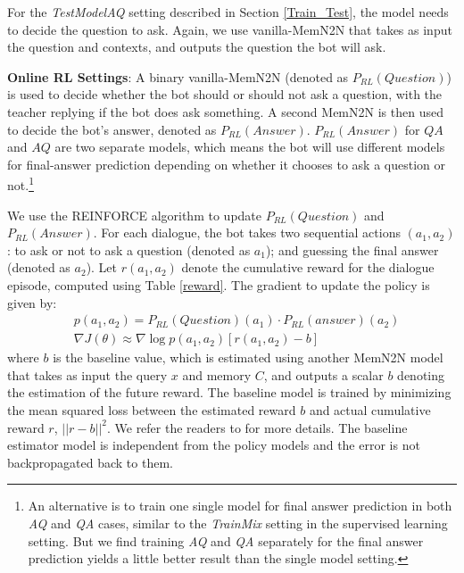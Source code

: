 For the
{\it TestModelAQ} setting described in Section \ref{Train_Test}, the model
 needs to decide the question to ask.
Again, we use vanilla-MemN2N that takes as input the question and contexts,
and outputs the question the bot will ask.

{\bf Online RL Settings}:
A binary vanilla-MemN2N (denoted as $P_{RL}(Question)$) is used to decide whether
the bot should or should not ask a question, with the teacher replying if the bot does ask something.
A second MemN2N
is then used to decide the bot's answer, %
denoted as $P_{RL}(Answer)$.
$P_{RL}(Answer)$ for $QA$ and $AQ$ are two separate models, which means the bot will use different  models
for final-answer prediction
depending on whether it
 chooses to ask a question or not.\footnote{An alternative is to train one single model
for final answer prediction in both {\it AQ} and {\it QA} cases, similar to the {\it TrainMix} setting in the supervised learning setting. But we find training {\it AQ} and {\it QA} separately for the final answer prediction yields a little better result than the single model setting.}


We use the REINFORCE algorithm \citep{williams1992simple} to update $P_{RL}(Question)$ and  $P_{RL}(Answer)$.
For each dialogue,
the bot takes two sequential actions $(a_1,a_2)$:
to ask or not to ask a question (denoted as $a_1$); and guessing the final answer (denoted as $a_2$).
Let $r(a_1,a_2)$ denote the cumulative reward for the dialogue episode, computed using Table \ref{reward}.
The gradient to update the policy is given by:
\begin{equation}
\begin{aligned}
&p(a_1,a_2)=P_{RL}(Question)(a_1) \cdot  P_{RL}(answer)(a_2)\\
&\nabla J(\theta)\approx \nabla\log p(a_1,a_2) [r(a_1,a_2)-b]
\end{aligned}
\end{equation}
where $b$ is the baseline value, which is estimated using another MemN2N model
that takes as input the query $x$ and memory $C$, and outputs a scalar $b$ denoting the estimation of the future reward.
The baseline model is trained by minimizing the mean squared loss between the estimated reward $b$
and actual cumulative reward $r$, $||r-b||^2$.
We refer the readers to  for more details.
The baseline estimator model is independent from the policy models and the
error is not backpropagated back to them.

